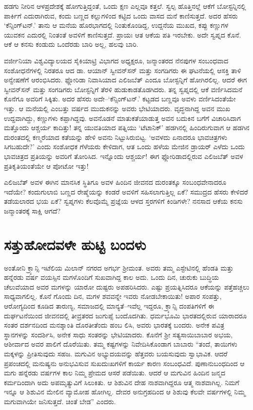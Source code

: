 ಹಡಗು ನೀರಿನ ಆಳಪ್ರದೇಶಕ್ಕೆ ಹೋಗುತ್ತಿದ್ದಂತೆ, ಒಂದು ಕ್ಷಣ ಎಲ್ಲವೂ ಕತ್ತಲೆ. ಸ್ವಲ್ಪ ಹೊತ್ತಿನಲ್ಲೆ ಆಕೆಗೆ ಬೋಸ್ಟನ್ನಿನಲ್ಲಿ ಪಾರ್ಕಿಗೆ ಎದುರಾಗಿರುವ, ಕಂದು ಬಣ್ಣದ ಕಲ್ಲುಗಳಿಂದ ಕಟ್ಟಿದ ಒಂದು ವಾಸದ ಮನೆ ಕಾಣಿಸುತ್ತದೆ. ಅದರ ಹೆಸರು ‘ಕೆನ್ಸಿಂಗ್​ಟನ್.’ ತಾನು ಆ ಮನೆಯ ಹೊರಭಾಗದಲ್ಲಿ ನಿಂತುಕೊಂಡಿದ್ದ, ಉದ್ದನೆಯ ಮುಖದ, ಕಪ್ಪು ಕಣ್ಣುಗಳ ಯುವಕನ ಎದುರಲ್ಲಿ ನಿಂತಂತೆ ಅವಳಿಗೆ ಕಾಣಿಸುತ್ತದೆ. ಪ್ರಾಯಃ ಆತ ಆಕೆಯ ಪತಿ ಇರಬೇಕು. ಅದೇ ಸ್ವಪ್ನದ ಕೊನೆ. ಆಕೆ ಆ ಕನಸು ಕಂಡುದು ಒಂದೆರಡು ಬಾರಿ ಅಲ್ಲ, ಹಲವು ಬಾರಿ.

ವರ್ಜೀನಿಯಾ ವಿಶ್ವವಿದ್ಯಾಲಯದ ಸೈಕಿಯಾಟ್ರಿ ವಿಭಾಗದ ಅಧ್ಯಕ್ಷರೂ, ಜನ್ಮಾಂತರದ ನೆನಪುಗಳ ಸಂಬಂಧವಾದ ಸಂಶೋಧನೆಗಳಲ್ಲಿ ನಿರತರೂ ಆದ ಡಾ. ಆಯಾನ್ ಸ್ವೀವನ್​ಸನ್ ಮತ್ತು ಸಂಗಡಿಗರು ಈ ಘಟನೆಯಲ್ಲಿ ಆಸಕ್ತಿ ತಾಳಿ ಅನ್ವೇಷಣೆಗೆ ಆರಂಭಿಸಿದರು. ಫ್ಲೋರಿಡಾ ನಿವಾಸಿಯಾದ ಎಲಿಜಬೆತ್ ಎಂದೂ ಬೋಸ್ಟನ್ನಿಗೆ ಹೋಗಿರಲಿಲ್ಲ. ಆದರೆ ಈಗ ಸ್ವೀವನ್​ಸನ್ ಮತ್ತು ಸಂಗಡಿಗರು ಬೋಸ್ಟನ್ನಿಗೆ ತೆರಳಿ ಹುಡುಕಾಡತೊಡಗಿದರು. ತನ್ನ ಸ್ವಪ್ನದಲ್ಲಿ ಆಕೆ ವರ್ಣಿಸಿದ\break ಮನೆ ಕೊನೆಗೂ ಅವರಿಗೆ ಸಿಕ್ಕಿತು. ಅದರ ಹೆಸರು ಅದೇ–‘ಕೆನ್ಸಿಂಗ್​ಟನ್.’ ಕಟ್ಟಡದ ಬಣ್ಣವೂ ಅವಳು ವರ್ಣಿಸಿದಂತೆಯೇ ಇತ್ತು. ಆ ಮನೆಯಲ್ಲಿ ಎಂಬತ್ತು ವರ್ಷದ ಮುದುಕನನ್ನು ಅವರು ಭೇಟಿಯಾದರು. ವೃದ್ಧನಾಗಿದ್ದ ಅವನ ಮುಖ ಉದ್ದವಾಗಿದ್ದು, ಕಣ್ಣುಗಳು ಕಪ್ಪಾಗಿದ್ದವು. ಅವನೊಡನೆ ಮಾತುಕತೆಯಾಡುತ್ತ ಅವನ ಬದುಕಿನ ಬಗೆಗೆ ವಿಚಾರಿಸಿದಾಗ ಮತ್ತೊಂದು ಆಶ್ಚರ್ಯ ಕಾದಿತ್ತು! ತನ್ನ ಯುವತಿಯಾದ ಪತ್ನಿಯು ‘ಟೆಟಾನಿಕ್​’ ಹಡಗಿನಲ್ಲಿ ಹಿಂದಿರುಗುವಾಗ ಆ ಹಡಗಿನ ದುರಂತದಲ್ಲಿ ಕಣ್ಮರೆಯಾದ ಕತೆಯನ್ನು ಹೇಳಿ ಅವನು ನಿಟ್ಟುಸಿರುಬಿಟ್ಟ. ‘ಅವಳದು ಏನಾದರೂ ಭಾವಚಿತ್ರಗಳು ಸಿಗಬಹುದೇ?’ ಎಂದು ಸಂಶೋಧಕ ಗೆಳೆಯರು ಕೇಳಿದಾಗ, ಆತ ಒಂದು ಹಳೆಯ ಮೇಜಿನ ಡ್ರಾಯರ್ ಎಳೆದು ಒಂದು ಭಾವಚಿತ್ರದ ಪ್ರತಿಯನ್ನು ಅವರಿಗೆ ತೋರಿಸಿದ. ಇನ್ನೊಂದು ಆಶ್ಚರ್ಯ! ಈಗ ಫ್ಲೋರಿಡಾದಲ್ಲಿರುವ ಎಲಿಜಬೆತ್ ಅವಳ ಪ್ರತಿಕೃತಿಯಂತೆಯೇ ಆ ಪೋಟೋ ಇತ್ತು!

ಎಲಿಜಬೆತ್ ಅವಳ ಈಗಿನ ಮಾನಸಿಕ ಸ್ಥಿತಿಗೂ ಅವಳ ಹಿಂದಿನ ಜೀವನದ ದುರಂತಕ್ಕೂ ಸಂಬಂಧವೇನಾದರೂ ಇದೆಯೇ? ಕಂದುಗುಲಾಬಿ ಬಣ್ಣದ ರೇಷ್ಮೆಯನ್ನು ಕಂಡರೆ ಅವಳಿಗೆ ಸಹಿಸಲಾಗುತ್ತಿಲ್ಲ ಏಕೆ? ಸಮುದ್ರದ ಹೆಸರು ಕೇಳಿದರೆ ತಡೆಯಲಾರದ ಭಯ ಏಕೆ? ಸ್ವಪ್ನಗಳು ಕೆಲವೊಮ್ಮೆ ಪ್ರಜ್ಞೆಯ ಆಳದ ಸ್ತರಗಳಿಗೆ ಕಿಂಡಿಗಳೇ? ನನಸಾದ ಆಕೆಯ ಕನಸು ಜನ್ಮಾಂತರಕ್ಕೆ ಸಾಕ್ಷಿ ಆಗದೆ?


\section*{ಸತ್ತುಹೋದವಳೇ ಹುಟ್ಟಿ ಬಂದಳು}


ಅಂತೋನಿ ಕ್ರ್ಯಾನ್ಸಿ ಇಟೆಲಿಯ ಮಿಲಾನ್ ನಗರದ ಅಗರ್ಭ ಶ‍್ರೀಮಂತ. ಅವರು ತಮ್ಮ ಎಸ್ಟೇಟಿನಲ್ಲಿ ಹೆಂಡತಿ ಮತ್ತು ಹನ್ನೆರಡು ವರ್ಷ ವಯಸ್ಸಿನ ಮಗಳೊಂದಿಗೆ ಸುಖವಾಗಿದ್ದ ಕಾಲ ಅದು. ಒಂದು ದಿನ, ಚುರುಕು ಬುದ್ಧಿಯ ಚೆಲುವೆಯಾದ ಅವರ ಮಗಳನ್ನು ಯಾರೋ ದುಷ್ಟರು ಅಪಹರಿಸಿದರು. ಎಷ್ಟು ಪ್ರಯತ್ನಿಸಿದರೂ ಆಕೆಯನ್ನು ಪತ್ತೆಹಚ್ಚಲು ಸಾಧ್ಯವಾಗಲಿಲ್ಲ. ಕೊನೆ ಗೊಂದು ದಿನ, ಮಗಳ ಶವವನ್ನೇ ಇವರು ನೋಡಬೇಕಾಯಿತು! ಅಪಾರ ಸಂಪತ್ತು, ಆರೋಗ್ಯದಿಂದ ಕೂಡಿದ ತಾರುಣ್ಯ, ಸಮಾಜದಲ್ಲಿ ಮಾನ್ಯತೆ–ಇವೆಲ್ಲ ಇದ್ದರೂ, ಕ್ರ್ಯಾನ್ಸಿ ದಂಪತಿಗಳಿಗೆ ಈ ದುರ್ಘಟನೆಯಿಂದ ಜೀವನದಲ್ಲಿ ತೀವ್ರತರದ ಜುಗುಪ್ಸೆ ಬಂದೊದಗಿತು. ಧರ್ಮಭೂಮಿ ಭಾರತದಲ್ಲಿರುವ ಯಾರಾದರೂ ಸಂತರ ದರ್ಶನದಿಂದ ಮನಶ್ಶಾಂತಿ ದೊರತೀತೆಂದು ಹಂಬ ಲಿಸಿ, ಅವರು ಭಾರತಕ್ಕೆ ಬಂದರು. ಅನೇಕ ಪವಿತ್ರ ಸ್ಥಾನಗಳನ್ನು ಸಂದರ್ಶಿಸಿ, ಅನೇಕ ಸಾಧು ಸಂತರನ್ನು ಭೇಟಿಯಾದರು. ಕೊನೆಗೆ ಶ‍್ರೀ ಸತ್ಯಸಾಯಿಬಾಬಾರ ಅಭಯ, ಆಶೀರ್ವಾದ ಅವರ ಪಾಲಿಗೆ ದೊರೆಯಿತು. ತಮ್ಮ ಕಷ್ಟಗಳನ್ನು ನಿವೇದಿಸಿಕೊಂಡಾಗ ಬಾಬಾರು “ತಂದೆ, ತಾಯಿಗಳು ಮಕ್ಕಳನ್ನು ಪ್ರೀತಿಸುವುದು ಸಹಜ. ಮಗುವಿನ ಅಭ್ಯುದಯವನ್ನು ಹೆತ್ತವರು ಬಯಸುವುದು ಸ್ವಾಭಾವಿಕ. ಆದರೆ ಪ್ರಪಂಚದಲ್ಲಿ ಮನುಷ್ಯನು ಅನುಭವಿಸುವ ಸುಖದುಃಖಗಳಿಗೆ ಕಾರ್ಯ ಕಾರಣ ಸಂಬಂಧವಿದೆ. ಪುಣಾನುಬಂಧದಿಂದ ಆ ಮಗು ಹನ್ನೆರಡು ವರ್ಷಗಳ ಕಾಲ ನಿಮ್ಮ ಪ್ರೇಮದ ಆಸರೆ ಪಡೆಯಿತು. ಆದರೆ ಆ ಮಗುವಿನ ಹಿಂದಿನ ಜನ್ಮದ ಕರ್ಮದಿಂದಾಗಿ ಅದು ಅಪಮೃತ್ಯುವಿಗೆ ಸಿಲುಕಿತು. ಆ ಶಿಶುವಿನ ದೇಹ ನಾಶವಾಗಿದ್ದರೂ ಆತ್ಮ ನಾಶವಾಗಿಲ್ಲ. ನಿಮಗೆ ಇನ್ನೂ ಆ ಶಿಶುವಿನ ಮೇಲಿನ ವ್ಯಾಮೋಹ ಹೋಗಿಲ್ಲ. ದೇವರ ಅನುಗ್ರಹದಿಂದ ಆ ಶಿಶುವು ಕೆಲವೇ ವರ್ಷಗಳಲ್ಲಿ ನಿಮ್ಮ ಮಗುವಾಗಿಯೇ ಜನಿಸುತ್ತದೆ. ಚಿಂತೆ ಬೇಡ” ಎಂದರು.

